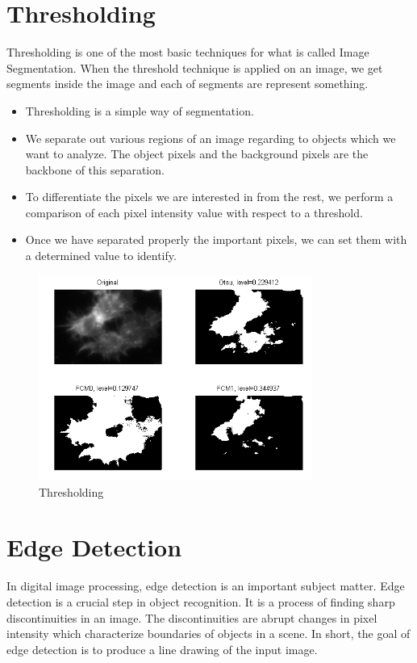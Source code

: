 \section{Thresholding}
Thresholding is one of the most basic techniques for what is called Image Segmentation. When the threshold technique is applied on an image, we get segments inside the image and each of segments are represent something.\cite{Thresholding}
\begin{itemize}
\item Thresholding is a simple way of segmentation.
\item We separate out various regions of an image regarding to objects which we want to analyze. The object pixels and the background pixels are the backbone of this separation.
\item To differentiate the pixels we are interested in from the rest, we perform a comparison of each pixel intensity value with respect to a threshold.
\item Once we have separated properly the important pixels, we can set them with a determined value to identify.
\end{itemize}

\begin{figure}[H]
\centering
\label{fig:Thresholding} \includegraphics[width=0.8\textwidth]{Thresholding}
\caption {Thresholding}
\end{figure}


\section{Edge Detection}
In digital image processing, edge detection is an important subject matter. Edge detection is a crucial step in object recognition. It is a process of finding sharp discontinuities in an image. The discontinuities are abrupt changes in pixel intensity which characterize boundaries of objects in a scene. In short, the goal of edge detection is to produce a line drawing of the input image. \cite{EdgeDetection}

